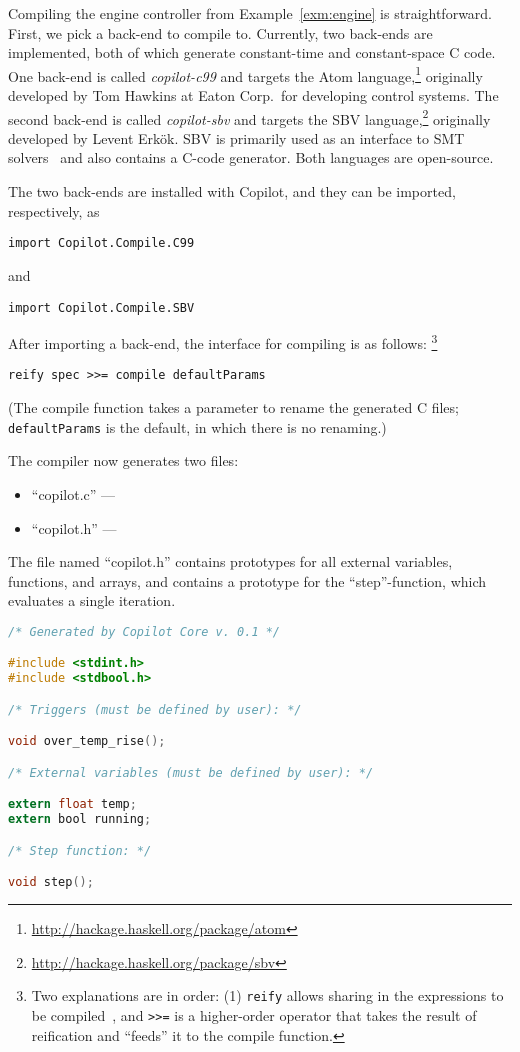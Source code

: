 Compiling the engine controller from Example~\ref{exm:engine} is
straightforward. First, we pick a back-end to compile to. Currently, two
back-ends are implemented, both of which generate constant-time and
constant-space C code. One back-end is called \emph{copilot-c99} and targets
the Atom language,\footnote{\url{http://hackage.haskell.org/package/atom}}
originally developed by Tom Hawkins at Eaton Corp.\ for developing control
systems. The second back-end is called \emph{copilot-sbv} and targets the SBV
language,\footnote{\url{http://hackage.haskell.org/package/sbv}} originally
developed by Levent Erk\"{o}k. SBV is primarily used as an interface to SMT
solvers~\cite{smt} and also contains a C-code generator. Both languages are
open-source.

The two back-ends are installed with Copilot, and they can be imported,
respectively, as

\begin{lstlisting}[language = Copilot]
import Copilot.Compile.C99
\end{lstlisting}
\noindent
and
\begin{lstlisting}[language = Copilot]
import Copilot.Compile.SBV
\end{lstlisting}

After importing a back-end, the interface for compiling is as
follows:
%
\footnote{Two explanations are in order: (1) {\tt reify} allows sharing in the
expressions to be compiled~\cite{DSLExtract}, and {\tt >>=} is a higher-order
operator that takes the result of reification and ``feeds'' it to the compile
function.}
%
\begin{lstlisting}[language = Copilot]
reify spec >>= compile defaultParams
\end{lstlisting}
%
\noindent
(The compile function takes a parameter to rename the generated C files; {\tt
defaultParams} is the default, in which there is no renaming.)

The compiler now generates two files:

\begin{itemize}
\item ``copilot.c'' ---
\item ``copilot.h'' ---
\end{itemize}

The file named ``copilot.h'' contains prototypes for all external variables,
functions, and arrays, and contains a prototype for the ``step''-function,
which evaluates a single iteration.

\begin{lstlisting}[language = C]
/* Generated by Copilot Core v. 0.1 */

#include <stdint.h>
#include <stdbool.h>

/* Triggers (must be defined by user): */

void over_temp_rise();

/* External variables (must be defined by user): */

extern float temp;
extern bool running;

/* Step function: */

void step();
\end{lstlisting}

